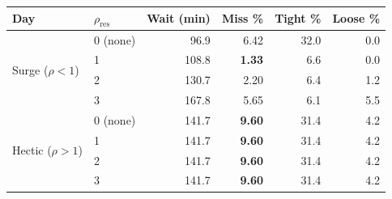 \begin{tabular}{llrrrr}
\toprule
\textbf{Day} & \textbf{$\rho_{\mathrm{res}}$} & \textbf{Wait (min)} & \textbf{Miss \%} & \textbf{Tight \%} & \textbf{Loose \%} \\
\midrule
\multirow{4}{*}{Surge ($\rho<1$)} & 0 (none) & 96.9 & 6.42 & 32.0 & 0.0 \\
 & 1 & 108.8 & \textbf{1.33} & 6.6 & 0.0 \\
 & 2 & 130.7 & 2.20 & 6.4 & 1.2 \\
 & 3 & 167.8 & 5.65 & 6.1 & 5.5 \\
\midrule
\multirow{4}{*}{Hectic ($\rho>1$)} & 0 (none) & 141.7 & \textbf{9.60} & 31.4 & 4.2 \\
 & 1 & 141.7 & \textbf{9.60} & 31.4 & 4.2 \\
 & 2 & 141.7 & \textbf{9.60} & 31.4 & 4.2 \\
 & 3 & 141.7 & \textbf{9.60} & 31.4 & 4.2 \\
\bottomrule
\end{tabular}
